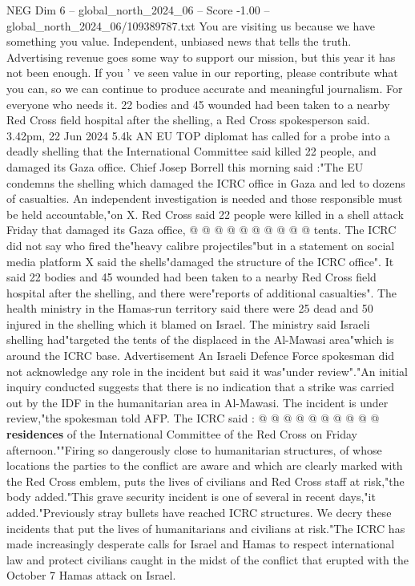\begin{textsample}{NEG Dim 6 – global\_north\_2024\_06 – Score -1.00 – global\_north\_2024\_06/109389787.txt}  \label{ex:f6_neg_308}
You are visiting us because we have something you value.
Independent, unbiased news that tells the truth.
Advertising revenue goes some way to support our mission, but this year it has not been enough.
If you ' ve seen value in our reporting, please contribute what you can, so we can continue to produce accurate and meaningful journalism.
For everyone who needs it. 22 bodies and 45 wounded had been taken to a nearby Red Cross field hospital after the shelling, a Red Cross spokesperson said. 3.42pm, 22 Jun 2024 5.4k AN EU TOP diplomat has called for a probe into a deadly shelling that the International Committee said killed 22 people, and damaged its Gaza office.
Chief Josep Borrell this morning said :"The EU condemns the shelling which damaged the ICRC office in Gaza and led to dozens of casualties.
An independent investigation is needed and those responsible must be held accountable,"on X.
Red Cross said 22 people were killed in a shell attack Friday that damaged its Gaza office, @ @ @ @ @ @ @ @ @ @ tents.
The ICRC did not say who fired the"heavy calibre projectiles"but in a statement on social media platform X said the shells"damaged the structure of the ICRC office".
It said 22 bodies and 45 wounded had been taken to a nearby Red Cross field hospital after the shelling, and there were"reports of additional casualties".
The health ministry in the Hamas-run territory said there were 25 dead and 50 injured in the shelling which it blamed on Israel.
The ministry said Israeli shelling had"targeted the tents of the displaced in the Al-Mawasi area"which is around the ICRC base.
Advertisement An Israeli Defence Force spokesman did not acknowledge any role in the incident but said it was"under review"."An initial inquiry conducted suggests that there is no indication that a strike was carried out by the IDF in the humanitarian area in Al-Mawasi.
The incident is under review,"the spokesman told AFP.
The ICRC said : @ @ @ @ @ @ @ @ @ @ \textbf{residences} of the International Committee of the Red Cross on Friday afternoon.""Firing so dangerously close to humanitarian structures, of whose locations the parties to the conflict are aware and which are clearly marked with the Red Cross emblem, puts the lives of civilians and Red Cross staff at risk,"the body added."This grave security incident is one of several in recent days,"it added."Previously stray bullets have reached ICRC structures.
We decry these incidents that put the lives of humanitarians and civilians at risk."The ICRC has made increasingly desperate calls for Israel and Hamas to respect international law and protect civilians caught in the midst of the conflict that erupted with the October 7 Hamas attack on Israel.

\end{textsample}
